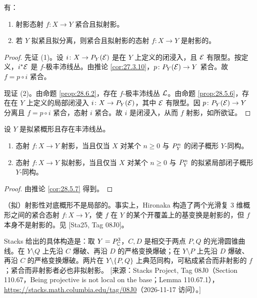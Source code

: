 \begin{theorem}\label{thm:29.1.5}
有：
\begin{enumerate}[label=(\arabic*),leftmargin=2.4em,itemsep=0.3ex]
  \item 射影态射 $f\colon X\to Y$ 紧合且拟射影。
  \item 若 $Y$ 拟紧且拟分离，则紧合且拟射影的态射 $f\colon X\to Y$ 是射影的。
\end{enumerate}
\end{theorem}

\begin{proof}
先证 (1)。设 $i\colon X\to P_Y(\mathcal{E})$ 是在 $Y$ 上定义的闭浸入，且 $\mathcal{E}$ 有限型。按定义，$i^*\mathcal{E}$ 是 $f$-极丰沛线丛。由推论 \ref{cor:27.3.10}，$p\colon P_Y(\mathcal{E})\to Y$ 紧合。故 $f=p\circ i$ 紧合。

现证 (2)。由命题 \ref{prop:28.6.2}，存在 $f$-极丰沛线丛 $\mathcal{L}$。由命题 \ref{prop:28.5.6}，存在在 $Y$ 上定义的局部闭浸入 $i\colon X\to P_Y(\mathcal{E})$，其中 $\mathcal{E}$ 有限型。因 $p\colon P_Y(\mathcal{E})\to Y$ 分离且 $f=p\circ i$ 紧合，态射 $i$ 紧合。故 $i$ 是闭浸入，从而 $f$ 射影，如所欲证。
\end{proof}

\begin{corollary}\label{cor:29.1.6}
设 $Y$ 是拟紧概形且存在丰沛线丛。
\begin{enumerate}[label=(\arabic*),leftmargin=2.4em,itemsep=0.3ex]
  \item 态射 $f\colon X\to Y$ 射影，当且仅当 $X$ 对某个 $n\ge 0$ 与 $P^n_Y$ 的闭子概形 $Y$-同构。
  \item 态射 $f\colon X\to Y$ 拟射影，当且仅当 $X$ 对某个 $n\ge 0$ 与 $P^n_Y$ 的拟紧局部闭子概形 $Y$-同构。
\end{enumerate}
\end{corollary}

\begin{proof}
由推论 \ref{cor:28.5.7} 得到。
\end{proof}

\begin{warning}\label{warn:29.1.7}
（拟）射影性对底概形不是局部的。事实上，Hironaka 构造了两个光滑复 $3$ 维概形之间的紧合态射 $f\colon X\to Y$，使 $f$ 在 $Y$ 的某个开覆盖上的基变换是射影的，但 $f$ 本身不是射影的。见 [Sta25, Tag 08J0]。
\end{warning}

\begin{yizhu}
Stacks 给出的具体构造是：取 $Y=P^3_{\mathbb{C}}$，$C,D$ 是相交于两点 $P,Q$ 的光滑圆锥曲线。在 $Y\setminus Q$ 上先沿 $C$ 爆破、再沿 $D$ 的严格变换爆破；在 $Y\setminus P$ 上先沿 $D$ 爆破、再沿 $C$ 的严格变换爆破。两片在 $Y\setminus\{P,Q\}$ 上典范同构，可粘成紧合而非射影的 $f$；紧合而非射影者必也非拟射影。
[来源：Stacks Project, Tag 08J0（Section 110.67，Being projective is not local on the base；Lemma 110.67.1），\url{https://stacks.math.columbia.edu/tag/08J0}（2026-11-17 访问）。]
\end{yizhu}

